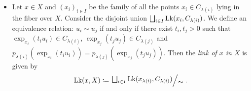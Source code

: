\begin{defin}
\begin{itemize}
  \item Let \(x \in X\) and \((x_i)_{i \in I}\) be the family of all the points \(x_i \in C_{\lambda(i)}\) lying in the fiber over \(X\). Consider the disjoint union \(\bigsqcup_{i \in I} \operatorname{Lk}(x_i, C_{\lambda(i)})\). We define an equivalence relation: \(u_i \sim u_j\) if and only if there exist \(t_i, t_j > 0\) such that \(\exp_{x_i}(t_i u_i) \in C_{\lambda(i)}\), \(\exp_{x_j}(t_j u_j) \in C_{\lambda(j)}\) and \(p_{\lambda(i)}(\exp_{x_i}(t_i u_i)) = p_{\lambda(j)}(\exp_{x_j}(t_j u_j))\). Then the \emph{link of \(x\) in \(X\)} is given by
    \begin{align*}
      \lk(x, X) \coloneqq \quot{\bigsqcup_{i \in I} \lk(x_{\lambda(i)}, C_{\lambda(i)})}{\sim}.
    \end{align*}
  \end{itemize}
\end{defin}

